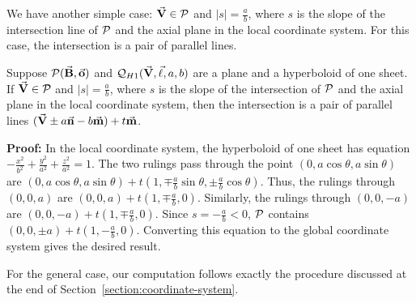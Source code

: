      We have another simple case: $\vec{\bf V}\in{\cal P}$ and $|s|=\frac{a}{b}$,
where $s$ is the slope of the intersection line of ${\cal P}$ and the axial 
plane in the local coordinate system.  For this case, the intersection is
a pair of parallel lines.

\begin{lemma}
\label{lemma:hy1-equal-slope}
     Suppose ${\cal P}(\vec{\bf B},\vec{\bf o})$ and 
${\cal Q}_{H1}(\vec{\bf V},\vec{\bf \ell},a,b)$ are a plane and a hyperboloid of
one sheet.  If $\vec{\bf V}\in{\cal P}$ and $|s|=\frac{a}{b}$, where $s$ is the 
slope of the intersection of ${\cal P}$ and the axial plane in the local 
coordinate system, then the intersection is a pair of parallel lines
$(\vec{\bf V}\pm a\vec{\bf n}-b\vec{\bf m})+t\vec{\bf m}$.
\end{lemma}
{\bf Proof:}  In the local coordinate system, the hyperboloid of one sheet
has equation $-\frac{x^2}{b^2}+\frac{y^2}{a^2}+\frac{z^2}{a^2}=1$.
The two rulings pass through the point 
$(0,a\cos\theta,a\sin\theta)$ are $(0,a\cos\theta,a\sin\theta)+t
\left(1,\mp\frac{a}{b}\sin\theta,\pm\frac{a}{b}\cos\theta\right)$.
Thus, the rulings through
$(0,0,a)$ are $(0,0,a)+t\left(1,\mp\frac{a}{b},0\right)$.  Similarly, the
rulings through $(0,0,-a)$ are $(0,0,-a)+t\left(1,\mp\frac{a}{b},0\right)$.
Since $s=-\frac{a}{b}<0$, ${\cal P}$ contains
$(0,0,\pm a)+t\left(1,-\frac{a}{b},0\right)$.  Converting this equation to 
the global coordinate system gives the desired result. \QED

     For the general case, our computation follows exactly the procedure
discussed at the end of Section~\ref{section:coordinate-system}.

